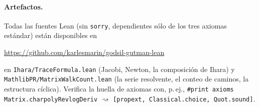 \documentclass[11pt]{article}
\newcommand{\lean}[1]{{\def\_{\textunderscore\allowbreak}\texttt{#1}}}
\begin{document}
\paragraph{Artefactos.} Todas las fuentes Lean (sin \lean{sorry}, dependientes s\'olo de los tres
axiomas est\'andar) est\'an disponibles en
\begin{center}
\url{https://github.com/karlesmarin/godsil-gutman-lean}
\end{center}
{\sloppy en \lean{Ihara/TraceFormula.lean} (Jacobi, Newton, la composici\'on de Ihara) y
\lean{MathlibPR/MatrixWalkCount.lean} (la serie resolvente, el conteo de caminos, la estructura
c\'iclica). Verifica la huella de axiomas con, p.\,ej., \lean{\#print axioms Matrix.charpolyRev\_logDeriv}
$\rightsquigarrow$ \lean{[propext, Classical.choice, Quot.sound]}.\par}
\end{document}
